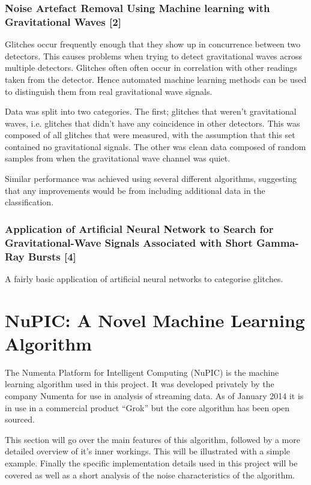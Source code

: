 \documentclass[a4paper]{jpconf}
\begin{document}
		\subsubsection*{Noise Artefact Removal Using Machine learning with Gravitational Waves [2]}
			Glitches occur frequently enough that they show up in concurrence between two detectors. This causes problems when trying to detect gravitational waves across multiple detectors. Glitches often often occur in correlation with other readings taken from the detector. Hence automated machine learning methods can be used to distinguish them from real gravitational wave signals.

			Data was split into two categories. The first; glitches that weren't gravitational waves, i.e. glitches that didn't have any coincidence in other detectors. This was composed of all glitches that were measured, with the assumption that this set contained no gravitational signals. The other was clean data composed of random samples from when the gravitational wave channel was quiet.

			Similar performance was achieved using several different algorithms, suggesting that any improvements would be from including additional data in the classification.

		\subsubsection*{Application of Artificial Neural Network to Search for Gravitational-Wave Signals Associated with Short Gamma-Ray Bursts [4]}
			A fairly basic application of artificial neural networks to categorise glitches.
		
\section{NuPIC: A Novel Machine Learning Algorithm}
	The Numenta Platform for Intelligent Computing (NuPIC) is the machine learning algorithm used in this project. It was developed privately by the company Numenta for use in analysis of streaming data. As of January 2014 it is in use in a commercial product ``Grok'' but the core algorithm has been open sourced.
		
	This section will go over the main features of this algorithm, followed by a more detailed overview of it's inner workings. This will be illustrated with a simple example. Finally the specific implementation details used in this project will be covered as well as a short analysis of the noise characteristics of the algorithm.
\end{document}
